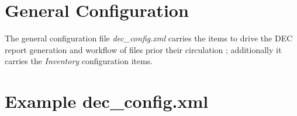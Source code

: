 \documentclass[dec_sum_main.tex]{subfiles}
\begin{document}
\section{General Configuration}
 
\par
\noindent
The general configuration file \textit{dec\_config.xml} carries the items to drive the DEC report generation and workflow of files prior their circulation ; additionally it carries the \textit{Inventory} configuration items.


\label{decconfigxml}
\section{Example dec\_config.xml}

\label{SourceDir}
\label{GlobalOutbox}
\end{document}
